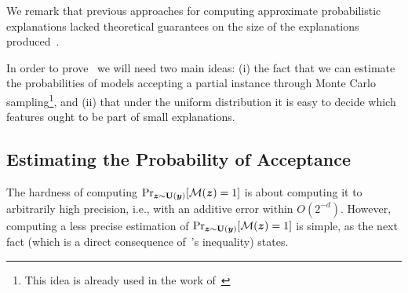 We remark that previous approaches for computing approximate probabilistic explanations lacked theoretical guarantees on the size of the explanations produced~\citep{izzaComputingProbabilisticAbductive2023,Izza2021EfficientEW,izza2024locallyminimalprobabilisticexplanations}.






In order to prove~ we will need two main ideas: (i) the fact that we can estimate the probabilities of models accepting a partial instance through Monte Carlo sampling\footnote{This idea is already used in the work of~\citet{izza2024locallyminimalprobabilisticexplanations}}, and (ii) that under the uniform distribution it is easy to decide which features ought to be part of small explanations.

\subsection{Estimating the Probability of Acceptance}
 The  hardness of computing
$\Pr_{{\bm{z}}  \sim \mathbf{U}({\bm{y}})}[\mathcal{M}({\bm{z}}) = 1]$ is about computing it to arbitrarily high precision, i.e., with an additive error within $O(2^{-d})$. However, computing a less precise estimation of $\Pr_{{\bm{z}} \sim \mathbf{U}({\bm{y}})}[\mathcal{M}({\bm{z}}) = 1]$ is simple, as the next fact (which is a direct consequence of~\citet{hoeffdingProbabilityInequalitiesSums1963a}'s inequality)  states.

